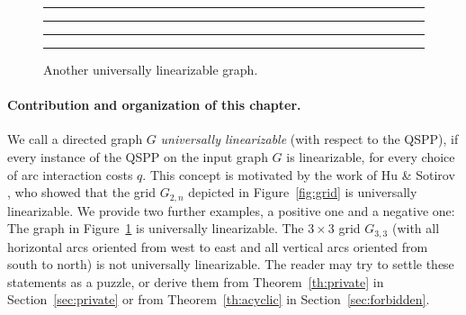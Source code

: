 \begin{figure}[bth]
\hrule\hrule
\medskip
\begin{center}
\end{center}
\vspace{-4ex}
\caption{Another universally linearizable graph.}
\label{fig:example2}
\bigskip
\hrule\hrule
\end{figure}

\paragraph{Contribution and organization of this chapter.}
We call a directed graph $G$ \emph{universally linearizable} (with respect to the QSPP), 
if every instance of the QSPP on the input graph $G$ is linearizable, for every choice 
of arc interaction costs $q$.
This concept is motivated by the work of Hu \& Sotirov \cite{huSo2018}, who showed that 
the grid $G_{2,n}$ depicted in Figure~\ref{fig:grid} is universally linearizable.
We provide two further examples, a positive one and a negative one: 
The graph in Figure~\ref{fig:example2} is universally linearizable.
The $3\times3$ grid $G_{3,3}$ (with all horizontal arcs oriented from west to east and 
all vertical arcs oriented from south to north) is not universally linearizable.
The reader may try to settle these statements as a puzzle, or derive them from Theorem~\ref{th:private}
in Section~\ref{sec:private} or from Theorem~\ref{th:acyclic} in Section~\ref{sec:forbidden}.

